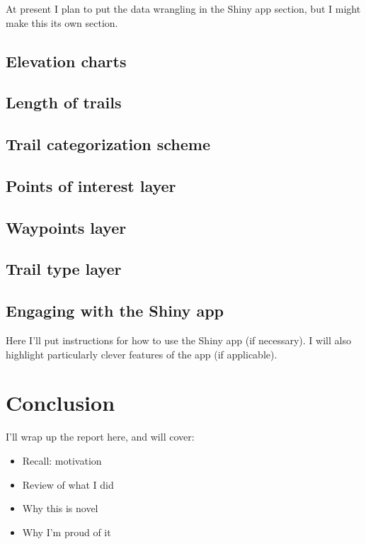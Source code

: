 \documentclass[12pt]{article}
\providecommand{\tightlist}{%
  \setlength{\itemsep}{0pt}\setlength{\parskip}{0pt}}
\begin{document}
At present I plan to put the data wrangling in the Shiny app section,
but I might make this its own section.

\hypertarget{elevation-charts-1}{%
\subsection{Elevation charts}\label{elevation-charts-1}}

\hypertarget{length-of-trails}{%
\subsection{Length of trails}\label{length-of-trails}}

\hypertarget{trail-categorization-scheme}{%
\subsection{Trail categorization
scheme}\label{trail-categorization-scheme}}

\hypertarget{points-of-interest-layer}{%
\subsection{Points of interest layer}\label{points-of-interest-layer}}

\hypertarget{waypoints-layer}{%
\subsection{Waypoints layer}\label{waypoints-layer}}

\hypertarget{trail-type-layer}{%
\subsection{Trail type layer}\label{trail-type-layer}}

\hypertarget{engaging-with-the-shiny-app}{%
\subsection{Engaging with the Shiny
app}\label{engaging-with-the-shiny-app}}

Here I'll put instructions for how to use the Shiny app (if necessary).
I will also highlight particularly clever features of the app (if
applicable).

\hypertarget{conclusion}{%
\section{Conclusion}\label{conclusion}}

I'll wrap up the report here, and will cover:

\begin{itemize}
\tightlist
\item
  Recall: motivation
\item
  Review of what I did
\item
  Why this is novel
\item
  Why I'm proud of it
\end{itemize}

\newpage



\end{document}
